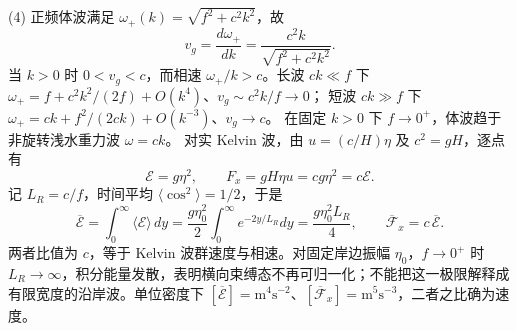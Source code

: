 (4) 正频体波满足 \(\omega_+(k)=\sqrt{f^2+c^2k^2}\)，故
\[
\boxed{v_g=\frac{d\omega_+}{dk}=\frac{c^2k}{\sqrt{f^2+c^2k^2}}}.
\]
当 \(k>0\) 时 \(0<v_g<c\)，而相速 \(\omega_+/k>c\)。长波 \(ck\ll f\) 下
\(\omega_+=f+c^2k^2/(2f)+O(k^4)\)、\(v_g\sim c^2k/f\to0\)；
短波 \(ck\gg f\) 下 \(\omega_+=ck+f^2/(2ck)+O(k^{-3})\)、\(v_g\to c\)。
在固定 \(k>0\) 下 \(f\to0^+\)，体波趋于非旋转浅水重力波 \(\omega=ck\)。
对实 Kelvin 波，由 \(u=(c/H)\eta\) 及 \(c^2=gH\)，逐点有
\[
\mathcal E=g\eta^2,\qquad F_x=gH\eta u=cg\eta^2=c\mathcal E.
\]
记 \(L_R=c/f\)，时间平均 \(\langle\cos^2\rangle=1/2\)，于是
\[
\boxed{\overline{\mathscr E}=\int_0^\infty\langle\mathcal E\rangle\,dy
=\frac{g\eta_0^2}{2}\int_0^\infty e^{-2y/L_R}dy
=\frac{g\eta_0^2L_R}{4}},\qquad
\boxed{\overline{\mathscr F}_x=c\,\overline{\mathscr E}}.
\]
两者比值为 \(c\)，等于 Kelvin 波群速度与相速。对固定岸边振幅 \(\eta_0\)，\(f\to0^+\) 时 \(L_R\to\infty\)，积分能量发散，表明横向束缚态不再可归一化；不能把这一极限解释成有限宽度的沿岸波。单位密度下 \([\overline{\mathscr E}]=\mathrm{m}^4\mathrm{s}^{-2}\)、\([\overline{\mathscr F}_x]=\mathrm{m}^5\mathrm{s}^{-3}\)，二者之比确为速度。
